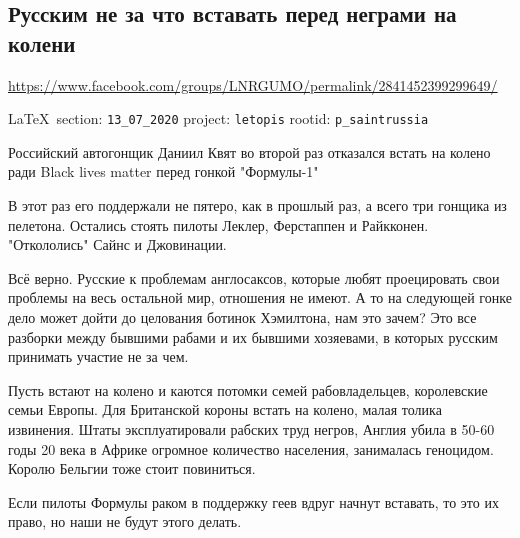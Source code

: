  
 
\subsection{Русским не за что вставать перед неграми на колени}
\url{https://www.facebook.com/groups/LNRGUMO/permalink/2841452399299649/}
  
\vspace{0.5cm}
{\small\LaTeX~section: \verb|13_07_2020| project: \verb|letopis| rootid: \verb|p_saintrussia|}
\vspace{0.5cm}
  
Российский автогонщик Даниил Квят во второй раз отказался встать на колено ради
Black lives matter перед гонкой "Формулы-1"

В этот раз его поддержали не пятеро, как в прошлый раз, а всего три гонщика из
пелетона. Остались стоять пилоты Леклер, Ферстаппен и Райкконен. "Откололись"
Сайнс и Джовинации.

Всё верно. Русские к проблемам англосаксов, которые любят проецировать свои
проблемы на весь остальной мир, отношения не имеют. А то на следующей гонке
дело может дойти до целования ботинок Хэмилтона, нам это зачем? Это все
разборки между бывшими рабами и их бывшими хозяевами, в которых русским
принимать участие не за чем.

Пусть встают на колено и каются потомки семей рабовладельцев, королевские семьи
Европы. Для Британской короны встать на колено, малая толика извинения. Штаты
эксплуатировали рабских труд негров, Англия убила в 50-60 годы 20 века в Африке
огромное количество населения, занималась геноцидом. Королю Бельгии тоже стоит
повиниться.

Если пилоты Формулы раком в поддержку геев вдруг начнут вставать, то это их
право, но наши не будут этого делать.

